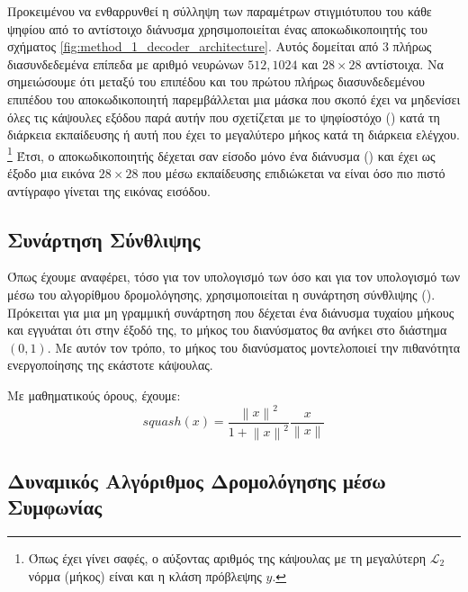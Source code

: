 Προκειμένου να ενθαρρυνθεί η σύλληψη των παραμέτρων στιγμιότυπου του κάθε ψηφίου από το αντίστοιχο διάνυσμα  χρησιμοποιείται ένας αποκωδικοποιητής του σχήματος \ref{fig:method_1_decoder_architecture}. Αυτός δομείται από 3 πλήρως διασυνδεδεμένα επίπεδα με αριθμό νευρώνων $512, 1024$ και $ 28 \times 28 $ αντίστοιχα. Να σημειώσουμε ότι μεταξύ του επιπέδου  και του πρώτου πλήρως διασυνδεδεμένου επιπέδου του αποκωδικοποιητή παρεμβάλλεται μια μάσκα που σκοπό έχει να μηδενίσει όλες τις κάψουλες εξόδου παρά αυτήν που σχετίζεται με το ψηφίο\textendash στόχο () κατά τη διάρκεια εκπαίδευσης ή αυτή που έχει το μεγαλύτερο μήκος κατά τη διάρκεια ελέγχου. \footnote{Όπως έχει γίνει σαφές, ο αύξοντας αριθμός της κάψουλας με τη μεγαλύτερη $\mathcal{L}_2$ νόρμα (μήκος) είναι και η κλάση πρόβλεψης $\hat{y}$.} Έτσι, ο αποκωδικοποιητής δέχεται σαν είσοδο μόνο ένα διάνυσμα () και έχει ως έξοδο μια εικόνα $28 \times 28$ που μέσω εκπαίδευσης επιδιώκεται να είναι όσο πιο πιστό αντίγραφο γίνεται της εικόνας εισόδου.\par

\subsection{Συνάρτηση Σύνθλιψης}

Όπως έχουμε αναφέρει, τόσο για τον υπολογισμό των  όσο και για τον υπολογισμό των  μέσω του αλγορίθμου δρομολόγησης, χρησιμοποιείται η συνάρτηση σύνθλιψης (). Πρόκειται για μια μη γραμμική συνάρτηση που δέχεται ένα διάνυσμα τυχαίου μήκους και εγγυάται ότι στην έξοδό της, το μήκος του διανύσματος θα ανήκει στο διάστημα $(0,1)$. Με αυτόν τον τρόπο, το μήκος του διανύσματος μοντελοποιεί την πιθανότητα ενεργοποίησης της εκάστοτε κάψουλας.\par

Με μαθηματικούς όρους, έχουμε:
\begin{equation}
    squash(x) = \frac{\left\lVert x\right\rVert^2}{1+\left\lVert x\right\rVert^2} \frac{x}{\left\lVert x\right\rVert}
\end{equation}

\subsection{Δυναμικός Αλγόριθμος Δρομολόγησης μέσω Συμφωνίας}

